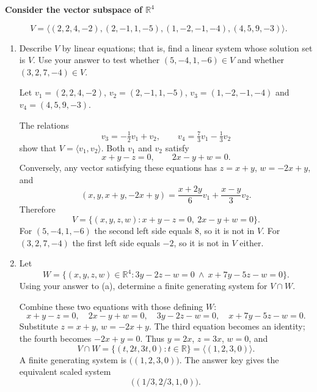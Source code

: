 \providecommand{\rank}{\operatorname{r}}
\providecommand{\RR}{\mathbb R}
\providecommand{\CC}{\mathbb C}
\providecommand{\KK}{\mathbb K}

\setcounter{enumi}{75}
\item {\bfseries\boldmath
Consider the vector subspace of $\RR^4$
}

\[
V=\langle(2,2,4,-2),(2,-1,1,-5),(1,-2,-1,-4),(4,5,9,-3)\rangle.
\]

\begin{enumerate}[label=\alph*)]

\item Describe $V$ by linear equations; that is, find a linear system whose solution set is $V$. Use your answer to test whether $(5,-4,1,-6)\in V$ and whether $(3,2,7,-4)\in V$.

\begin{answer}
Let $v_1=(2,2,4,-2)$, $v_2=(2,-1,1,-5)$,
$v_3=(1,-2,-1,-4)$ and $v_4=(4,5,9,-3)$.

The relations
\[
 v_3=-\tfrac12v_1+v_2,\qquad v_4=\tfrac73v_1-\tfrac13v_2
\]
show that $V=\langle v_1,v_2\rangle$. Both $v_1$ and $v_2$ satisfy
\[
 x+y-z=0,\qquad 2x-y+w=0.
\]
Conversely, any vector satisfying these equations has $z=x+y$, $w=-2x+y$,
and
\[
 (x,y,x+y,-2x+y)
 =\frac{x+2y}{6}v_1+\frac{x-y}{3}v_2.
\]
Therefore
\[
 V=\{(x,y,z,w):x+y-z=0,\ 2x-y+w=0\}.
\]
For $(5,-4,1,-6)$ the second left side equals $8$, so it is not in $V$.
For $(3,2,7,-4)$ the first left side equals $-2$, so it is not in $V$ either.
\end{answer}

\item Let
\[
W=\{(x,y,z,w)\in\RR^4:3y-2z-w=0\ \land\ x+7y-5z-w=0\}.
\]
Using your answer to (a), determine a finite generating system for $V\cap W$.

\begin{answer}
Combine these two equations with those defining $W$:
\[
 x+y-z=0,\quad2x-y+w=0,\quad3y-2z-w=0,\quad x+7y-5z-w=0.
\]
Substitute $z=x+y$, $w=-2x+y$. The third equation becomes an identity;
the fourth becomes $-2x+y=0$. Thus $y=2x$, $z=3x$, $w=0$, and
\[
 V\cap W=\{(t,2t,3t,0):t\in\RR\}=\langle(1,2,3,0)\rangle.
\]
A finite generating system is $\bigl((1,2,3,0)\bigr)$.
The answer key gives the equivalent scaled system
\[
 \bigl((1/3,2/3,1,0)\bigr).
\]
\end{answer}
\end{enumerate}
